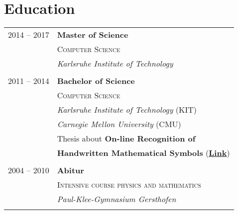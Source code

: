 \documentclass[a4paper,10pt]{article} %
\begin{document}
{\begin{minipage}[t]{0.44\textwidth}

\section{Education}

\begin{tabular}{rl} %


2014 -- 2017 & \textbf{Master of Science} \\
& \textsc{Computer Science} \\
& \textit{Karlsruhe Institute of Technology}\\
&\\


2011 -- 2014 & \textbf{Bachelor of Science} \\
& \textsc{Computer Science} \\
& \textit{Karlsruhe Institute of Technology} (KIT)\\
& \textit{Carnegie Mellon University} (CMU)\\
& Thesis about {\textbf{\color{headings}On-line Recognition of}}\\
& {\textbf{\color{headings}Handwritten Mathematical Symbols}} (\textbf{\href{http://martin-thoma.com/write-math/}{Link}})\\
&\\


2004 -- 2010 & \textbf{Abitur}\\
& \textsc{Intensive course physics and mathematics} \\
& \textit{Paul-Klee-Gymnasium Gersthofen}\\
&\\


\end{tabular}\\[10pt]


\end{minipage}}
\end{document}
